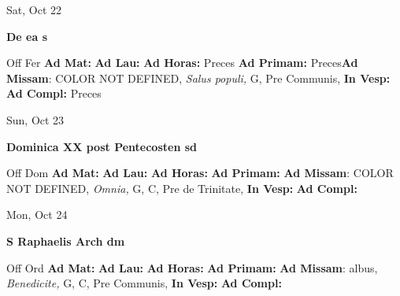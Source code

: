 \documentclass[10pt]{book}
\begin{document}
\begin{center}
\begin{minipage}{3.5in}
\vspace{2em}
\begin{center}Sat, Oct 22
\end{center}
\textbf{ \large De ea
\textnormal{\normalsize s}}

\begin{justify}Off Fer
\textbf{Ad Mat: }
\textbf{Ad Lau: }
\textbf{Ad Horas: }Preces
\textbf{Ad Primam: }Preces\textbf{Ad Missam}: COLOR NOT DEFINED, \textit{Salus populi,} G, Pre Communis, 
\textbf{In Vesp: }
\textbf{Ad Compl: }Preces
\end{justify}
\end{minipage}
\end{center}

\begin{center}
\begin{minipage}{3.5in}
\vspace{2em}
\begin{center}Sun, Oct 23
\end{center}
\textbf{ \large Dominica XX post Pentecosten
\textnormal{\normalsize sd}}

\begin{justify}Off Dom
\textbf{Ad Mat: }
\textbf{Ad Lau: }
\textbf{Ad Horas: }
\textbf{Ad Primam: }\textbf{Ad Missam}: COLOR NOT DEFINED, \textit{Omnia,} G, C, Pre de Trinitate, 
\textbf{In Vesp: }
\textbf{Ad Compl: }
\end{justify}
\end{minipage}
\end{center}

\begin{center}
\begin{minipage}{3.5in}
\vspace{2em}
\begin{center}Mon, Oct 24
\end{center}
\textbf{ \large S Raphaelis Arch
\textnormal{\normalsize dm}}

\begin{justify}Off Ord
\textbf{Ad Mat: }
\textbf{Ad Lau: }
\textbf{Ad Horas: }
\textbf{Ad Primam: }\textbf{Ad Missam}: albus, \textit{Benedicite,} G, C, Pre Communis, 
\textbf{In Vesp: }
\textbf{Ad Compl: }
\end{justify}
\end{minipage}
\end{center}
\end{document}

